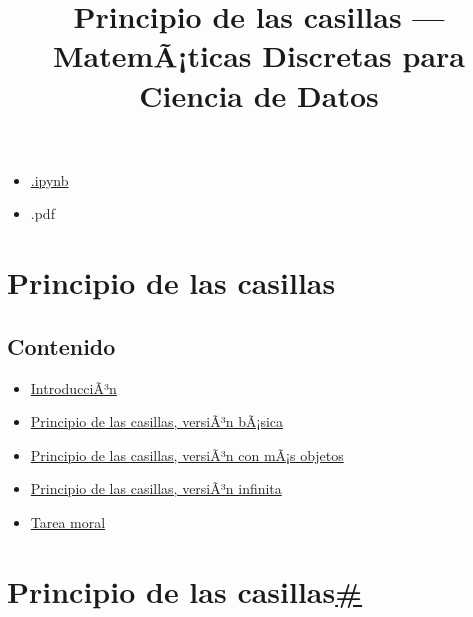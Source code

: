 \documentclass[
]{article}
\title{Principio de las casillas --- MatemÃ¡ticas Discretas para Ciencia
de Datos}
\author{}
\date{}
\providecommand{\tightlist}{%
  \setlength{\itemsep}{0pt}\setlength{\parskip}{0pt}}
\begin{document}
\maketitle

\label{main-content}
{}

\emph{}

\begin{itemize}
\tightlist
\item
  \href{../_sources/P1/Casillas.ipynb}{{ \emph{} } {.ipynb}}
\item
  { \emph{} } {.pdf}
\end{itemize}

{ \emph{} }

{}

\label{jb-print-docs-body}
\section{Principio de las casillas}\label{principio-de-las-casillas}

\label{print-main-content}
\label{jb-print-toc}
\subsection{Contenido}\label{contenido}

\begin{itemize}
\tightlist
\item
  \hyperref[introduccion]{IntroducciÃ³n}
\item
  \hyperref[principio-de-las-casillas-version-basica]{Principio de las
  casillas, versiÃ³n bÃ¡sica}
\item
  \hyperref[principio-de-las-casillas-version-con-mas-objetos]{Principio
  de las casillas, versiÃ³n con mÃ¡s objetos}
\item
  \hyperref[principio-de-las-casillas-version-infinita]{Principio de las
  casillas, versiÃ³n infinita}
\item
  \hyperref[tarea-moral]{Tarea moral}
\end{itemize}

\label{searchbox}

\label{principio-de-las-casillas}
\section{\texorpdfstring{Principio de las
casillas\hyperref[principio-de-las-casillas]{\#}}{Principio de las casillas\#}}\label{principio-de-las-casillas-1}
\end{document}

